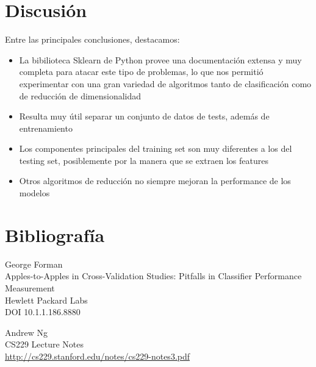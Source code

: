 \documentclass{article}
\begin{document}
\section{Discusión}

Entre las principales conclusiones, destacamos:
\begin{itemize}
	\item La bibilioteca Sklearn de Python provee una documentación extensa y muy completa para atacar este tipo de problemas, lo que nos permitió experimentar con una gran variedad de algoritmos tanto de clasificación como de reducción de dimensionalidad
	\item Resulta muy útil separar un conjunto de datos de tests, además de entrenamiento
	\item Los componentes principales del training set son muy diferentes a los del testing set, posiblemente por la manera que se extraen los features
	\item Otros algoritmos de reducción no siempre mejoran la performance de los modelos
\end{itemize}

\section{Bibliografía}

\begin{thebibliography}{9}

	George Forman \\
	Apples-to-Apples in Cross-Validation Studies: Pitfalls in Classifier Performance Measurement \\
	Hewlett Packard Labs \\
	DOI 10.1.1.186.8880

    Andrew Ng \\
	CS229 Lecture Notes \\
	\url{http://cs229.stanford.edu/notes/cs229-notes3.pdf}

\end{thebibliography}
\end{document}
